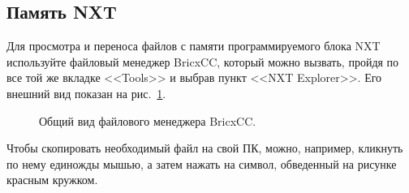 \documentclass[12pt,a4paper,openany]{extarticle}
\begin{document}
\subsection{Память NXT}
\hspace*{\parindent}Для просмотра и переноса файлов с памяти программируемого блока NXT используйте файловый менеджер BricxCC, который можно вызвать, пройдя по все той же вкладке <<Tools>> и выбрав пункт <<NXT Explorer>>. 
Его внешний вид показан на рис.~\ref{nxt_explorer}. 

\begin{figure}[h]
	\noindent{}
	\caption{Общий вид файлового менеджера BricxCC.}
	\label{nxt_explorer}
\end{figure}

Чтобы скопировать необходимый файл на свой ПК, можно, например, кликнуть по нему единожды мышью, а затем нажать на символ, обведенный на рисунке красным кружком.
\end{document}
